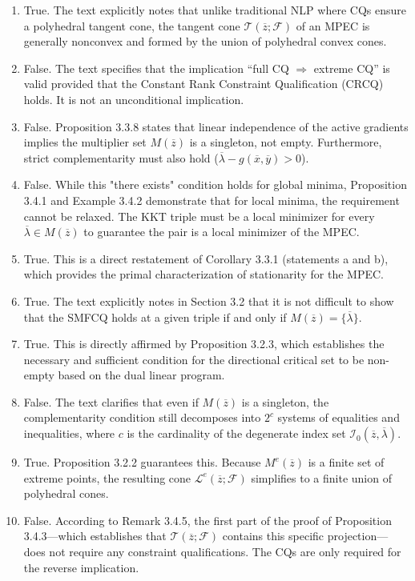 \documentclass[pdflatex,sn-mathphys-num]{sn-jnl}%
\theoremstyle{definition}
\begin{document}
\begin{enumerate}[label=(\roman*)]
\item True.
The text explicitly notes that unlike traditional NLP where CQs ensure a polyhedral tangent cone, the tangent cone $\mathcal{T}(\overline{z};\mathcal{F})$ of an MPEC is generally nonconvex and formed by the union of polyhedral convex cones.

\item False.
The text specifies that the implication ``full CQ $\Rightarrow$ extreme CQ'' is valid provided that the Constant Rank Constraint Qualification (CRCQ) holds. It is not an unconditional implication.

\item False.
Proposition 3.3.8 states that linear independence of the active gradients implies the multiplier set $M(\overline{z})$ is a singleton, not empty. Furthermore, strict complementarity must also hold ($\overline{\lambda} - g(\overline{x},\overline{y}) > 0$).

\item False.
While this "there exists" condition holds for global minima, Proposition 3.4.1 and Example 3.4.2 demonstrate that for local minima, the requirement cannot be relaxed. The KKT triple must be a local minimizer for every $\overline{\lambda} \in M(\overline{z})$ to guarantee the pair is a local minimizer of the MPEC.

\item True.
This is a direct restatement of Corollary 3.3.1 (statements a and b), which provides the primal characterization of stationarity for the MPEC.

\item True.
The text explicitly notes in Section 3.2 that it is not difficult to show that the SMFCQ holds at a given triple if and only if $M(\overline{z}) = \{\overline{\lambda}\}$.

\item True. 
This is directly affirmed by Proposition 3.2.3, which establishes the necessary and sufficient condition for the directional critical set to be non-empty based on the dual linear program.

\item False.
The text clarifies that even if $M(\overline{z})$ is a singleton, the complementarity condition still decomposes into $2^c$ systems of equalities and inequalities, where $c$ is the cardinality of the degenerate index set $\mathcal{I}_0(\overline{z},\overline{\lambda})$.

\item True.  
Proposition 3.2.2 guarantees this. Because $M^e(\overline{z})$ is a finite set of extreme points, the resulting cone $\mathcal{L}^e(\overline{z};\mathcal{F})$ simplifies to a finite union of polyhedral cones.

\item False. 
According to Remark 3.4.5, the first part of the proof of Proposition 3.4.3—which establishes that $\mathcal{T}(\overline{z};\mathcal{F})$ contains this specific projection—does not require any constraint qualifications. The CQs are only required for the reverse implication.
\end{enumerate}
\end{document}
